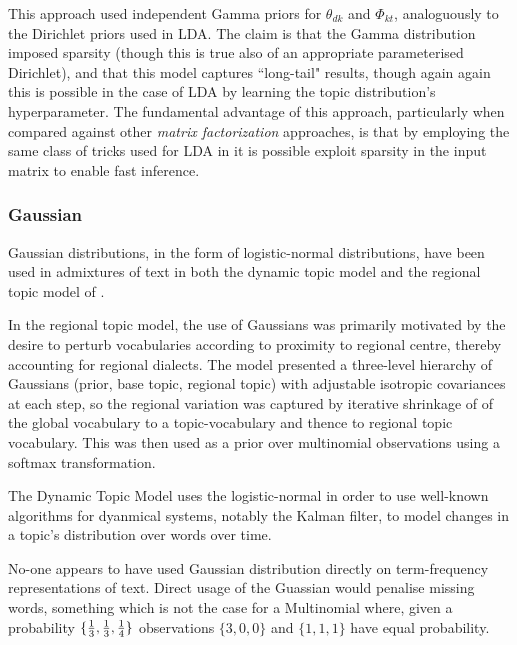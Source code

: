 This approach used independent Gamma priors for $\theta_{dk}$ and $\Phi_{kt}$, analoguously to the Dirichlet priors used in LDA. The claim is that the Gamma distribution imposed sparsity (though this is true also of an appropriate parameterised Dirichlet), and that this model captures ``long-tail" results, though again again this is possible in the case of LDA by learning the topic distribution's hyperparameter\cite{Wallach2009a}. The fundamental advantage of this approach, particularly when compared against other \emph{matrix factorization} approaches, is that by employing the same class of tricks used for LDA in \cite{Mimno2012a} it is possible exploit sparsity in the input matrix to enable fast inference.

\subsubsection*{Gaussian}

Gaussian distributions, in the form of logistic-normal distributions, have been used in admixtures of text in both the dynamic topic model\cite{Blei2006a} and the regional topic model of \cite{Eisenstein2010}.

In the regional topic model, the use of Gaussians was primarily motivated by the desire to perturb vocabularies according to proximity to regional centre, thereby accounting for regional dialects. The model presented a three-level hierarchy of Gaussians (prior, base topic, regional topic) with adjustable isotropic covariances at each step, so the regional variation was captured by iterative shrinkage of of the global vocabulary to a topic-vocabulary and thence to regional topic vocabulary. This was then used as a prior over multinomial observations using a softmax transformation.

The Dynamic Topic Model uses the logistic-normal in order to use well-known algorithms for dyanmical systems, notably the Kalman filter, to model changes in a topic's distribution over words over time.

No-one appears to have used Gaussian distribution directly on term-frequency representations of text. Direct usage of the Guassian would penalise missing words, something which is not the case for a Multinomial where, given a probability $\{\frac{1}{ {3} }, \frac{1}{ {3} }, \frac{1}{ {4} }\}$ observations $\{3,0,0\}$ and $\{1,1,1\}$ have equal probability.

